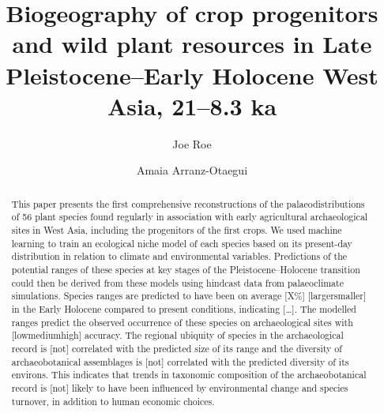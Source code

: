 \documentclass[
  authoryear,
  review]{elsarticle}
\begin{document}
\begin{frontmatter}
\title{Biogeography of crop progenitors and wild plant resources in Late
Pleistocene--Early Holocene West Asia, 21--8.3 ka}
\author[1,2]{Joe Roe%
%
}
\author[3]{Amaia Arranz-Otaegui%
%
}





        
\begin{abstract}
This paper presents the first comprehensive reconstructions of the
palaeodistributions of 56 plant species found regularly in association
with early agricultural archaeological sites in West Asia, including the
progenitors of the first crops. We used machine learning to train an
ecological niche model of each species based on its present-day
distribution in relation to climate and environmental variables.
Predictions of the potential ranges of these species at key stages of
the Pleistocene--Holocene transition could then be derived from these
models using hindcast data from palaeoclimate simulations. Species
ranges are predicted to have been on average {[}X\%{]}
{[}larger\textbar smaller{]} in the Early Holocene compared to present
conditions, indicating {[}\ldots{]}. The modelled ranges predict the
observed occurrence of these species on archaeological sites with
{[}low\textbar medium\textbar high{]} accuracy. The regional ubiquity of
species in the archaeological record is {[}not{]} correlated with the
predicted size of its range and the diversity of archaeobotanical
assemblages is {[}not{]} correlated with the predicted diversity of its
environs. This indicates that trends in taxonomic composition of the
archaeobotanical record is {[}not{]} likely to have been influenced by
environmental change and species turnover, in addition to human economic
choices.
\end{abstract}





\end{frontmatter}
    
\end{document}
